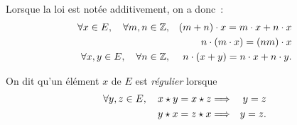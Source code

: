 \documentclass{magnolia}
\begin{document}
\begin{remarqueUnique}
\remarque Lorsque la loi est notée additivement, on a donc~:
  \begin{eqnarray*}
  \forall x\in E,\quad \forall m,n\in\mathbb{Z}, & & (m+n)\cdot x=m\cdot x+n\cdot x\\
                                        & & n\cdot(m\cdot x)=(nm)\cdot x\\
  \forall x,y\in E,\quad \forall n\in\mathbb{Z}, & & n\cdot(x+y)=n\cdot x+n\cdot y.
  \end{eqnarray*}
\end{remarqueUnique}


\begin{definition}
On dit qu'un élément $x$ de $E$ est \emph{régulier} lorsque
\begin{eqnarray*}
\forall y,z\in E ,\quad x\star y=x\star z &\Longrightarrow& y=z\\
                       y\star x=z\star x &\Longrightarrow& y=z.
\end{eqnarray*}
\end{definition}


\end{document}
